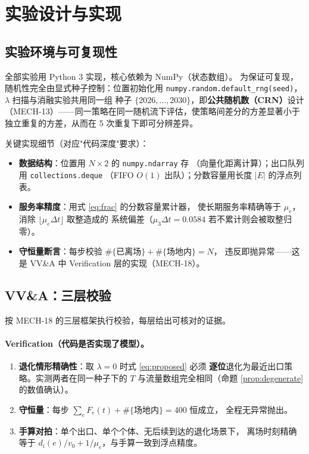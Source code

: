\section{实验设计与实现}
\label{sec:exp}

\subsection{实验环境与可复现性}
\label{sec:setup}

全部实验用 Python 3 实现，核心依赖为 NumPy（状态数组）。
为保证可复现，随机性完全由显式种子控制：位置初始化用
\texttt{numpy.random.default\_rng(seed)}，$\lambda$ 扫描与消融实验共用同一组
种子 $\{2026,\dots,2030\}$，即\textbf{公共随机数（CRN）}设计
（MECH-13）——同一策略在同一随机流下评估，使策略间差分的方差显著小于
独立重复的方差，从而在 5 次重复下即可分辨差异。

关键实现细节（对应"代码深度"要求）：
\begin{itemize}
  \item \textbf{数据结构}：位置用 $N\times2$ 的 \texttt{numpy.ndarray} 存
        （向量化距离计算）；出口队列用 \texttt{collections.deque}
        （FIFO $O(1)$ 出队）；分数容量用长度 $|E|$ 的浮点列表。
  \item \textbf{服务率精度}：用式 \eqref{eq:frac} 的分数容量累计器，
        使长期服务率精确等于 $\mu_e$，消除 $\lfloor\mu_e\Delta t\rfloor$ 取整造成的
        系统偏差（$\mu_3\Delta t=0.0584$ 若不累计则会被取整归零）。
  \item \textbf{守恒量断言}：每步校验
        $\#\{\text{已离场}\}+\#\{\text{场地内}\}=N$，
        违反即抛异常——这是 VV\&A 中 Verification 层的实现（MECH-18）。
\end{itemize}

\subsection{VV\&A：三层校验}
\label{sec:vva}

按 MECH-18 的三层框架执行校验，每层给出可核对的证据。

\paragraph{Verification（代码是否实现了模型）。}
\begin{enumerate}[label=V\arabic*.]
  \item \textbf{退化情形精确性}：取 $\lambda=0$ 时式 \eqref{eq:proposed} 必须
        \textbf{逐位}退化为最近出口策略。实测两者在同一种子下的
        $T$ 与流量数组完全相同（命题 \ref{prop:degenerate} 的数值确认）。
  \item \textbf{守恒量}：每步 $\sum_e F_e(t)+\#\{\text{场地内}\}=400$ 恒成立，
        全程无异常抛出。
  \item \textbf{手算对拍}：单个出口、单个个体、无后续到达的退化场景下，
        离场时刻精确等于 $d_i(e)/v_0+1/\mu_e$，与手算一致到浮点精度。
\end{enumerate}

